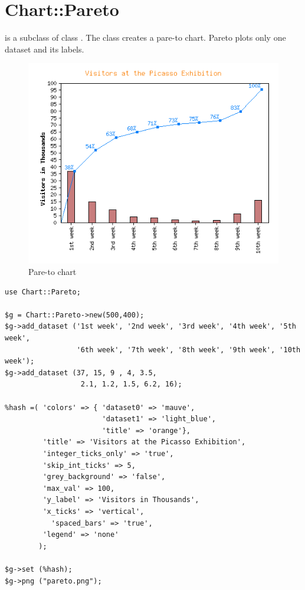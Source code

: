 %
%
\section{Chart::Pareto}
\begin{Description} 
 is a subclass of class .
The class  creates a pare-to chart. 
Pareto plots only one dataset and its labels.
\end{Description}


\begin{figure}[h]
	\begin{center}
		\includegraphics[scale=0.7]{d_pareto2.png}
	\end{center}
	\caption{Pare-to chart}
	\label{fig:pareto}
\end{figure}
\begin{verbatim}
use Chart::Pareto;

$g = Chart::Pareto->new(500,400);
$g->add_dataset ('1st week', '2nd week', '3rd week', '4th week', '5th week',
                 '6th week', '7th week', '8th week', '9th week', '10th week');
$g->add_dataset (37, 15, 9 , 4, 3.5,
                  2.1, 1.2, 1.5, 6.2, 16);

%hash =( 'colors' => { 'dataset0' => 'mauve',
                       'dataset1' => 'light_blue',
                       'title' => 'orange'},
         'title' => 'Visitors at the Picasso Exhibition',
         'integer_ticks_only' => 'true',
         'skip_int_ticks' => 5,
         'grey_background' => 'false',
         'max_val' => 100,
         'y_label' => 'Visitors in Thousands',
         'x_ticks' => 'vertical',
 	       'spaced_bars' => 'true',
         'legend' => 'none'
        );
	
$g->set (%hash); 
$g->png ("pareto.png");
\end{verbatim}
